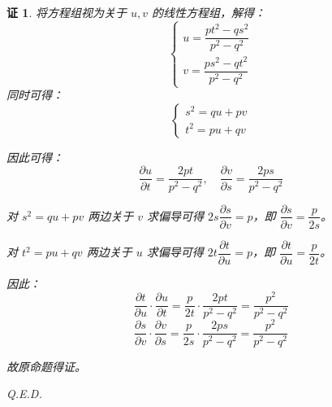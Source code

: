 \documentclass[a4paper,12pt]{article}
\newtheorem*{pf}{证}
\begin{document}
\begin{pf}
    将方程组视为关于 $u,v$ 的线性方程组，解得：
    $$\begin{cases}
            u=\dfrac{pt^2-qs^2}{p^2-q^2} \\
            v=\dfrac{ps^2-qt^2}{p^2-q^2}
        \end{cases}$$
    同时可得：
    $$\begin{cases}
            s^2=qu+pv \\
            t^2=pu+qv
        \end{cases}$$

    因此可得：
    $$\frac{\partial u}{\partial t}=\frac{2pt}{p^2-q^2},\quad \frac{\partial v}{\partial s}=\frac{2ps}{p^2-q^2}$$

    对 $s^2=qu+pv$ 两边关于 $v$ 求偏导可得 $2s\dfrac{\partial s}{\partial v}=p$，即 $\dfrac{\partial s}{\partial v}=\dfrac{p}{2s}$。

    对 $t^2=pu+qv$ 两边关于 $u$ 求偏导可得 $2t\dfrac{\partial t}{\partial u}=p$，即 $\dfrac{\partial t}{\partial u}=\dfrac{p}{2t}$。

    因此：
    $$\frac{\partial t}{\partial u}\cdot\frac{\partial u}{\partial t}=\frac{p}{2t}\cdot\frac{2pt}{p^2-q^2}=\frac{p^2}{p^2-q^2}$$
    $$\frac{\partial s}{\partial v}\cdot\frac{\partial v}{\partial s}=\frac{p}{2s}\cdot\frac{2ps}{p^2-q^2}=\frac{p^2}{p^2-q^2}$$

    故原命题得证。

    Q.E.D.
\end{pf}
\end{document}
